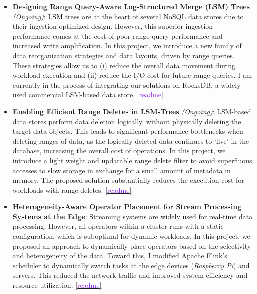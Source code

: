 \begin{itemize}\setlength\itemsep{0.3em}
  \item \textbf{Designing Range Query-Aware Log-Structured Merge (LSM) Trees} \textit{(Ongoing)}: LSM trees are at 
  the heart of several NoSQL data stores due to their ingestion-optimized design. However, this superior ingestion 
  performance comes at the cost of poor range query performance and increased write amplification. In this project, we 
  introduce a new family of data reorganization strategies and data layouts, driven by range queries. These strategies allow us to (i) 
  reduce the overall data movement during workload execution and (ii) reduce the I/O cost for future range queries. I am
  currently in the process of integrating our solutions on RocksDB, a widely used commercial LSM-based data store.
  \href{https://shubhamkaushik.com/projects/designing_range_query_aware_log_structured_merge_tree/}{[\textcolor{blueviolet}{readme}]}


  \item \textbf{Enabling Efficient Range Deletes in LSM-Trees} \textit{(Ongoing)}: LSM-based data stores perform 
  data deletion logically, without physically deleting the target data objects. This leads to significant performance 
  bottlenecks when deleting ranges of data, as the logically deleted data continues to `live' in the database, 
  increasing the overall cost of operations. In this project, we introduce a light weight and updatable range delete filter to avoid 
  superfluous accesses to slow storage in exchange for a small amount of metadata in memory. The proposed solution 
  substantially reduces the execution cost for workloads with range deletes.
  \href{https://shubhamkaushik.com/projects/enabling_efficient_range_deletes_in_lsm_trees/}{[\textcolor{blueviolet}{readme}]}


  \item \textbf{Heterogeneity-Aware Operator Placement for Stream Processing Systems at the Edge}: Streaming systems are 
  widely used for real-time data processing. However, all operators within a cluster runs with a static configuration, which 
  is suboptimal for dynamic workloads. In this project, we proposed an approach to dynamically place operators based on 
  the selectivity and heterogeneity of the data. Toward this, I modified Apache Flink's scheduler to dynamically 
  switch tasks at the edge devices (\textit{Raspberry Pi}) and servers. This reduced the network traffic and improved 
  system efficiency and resource utilization.
  \href{https://shubhamkaushik.com/projects/finding_vulnuerbilities_in_VS_Code_extensions/}{[\textcolor{blueviolet}{readme}]}



\end{itemize}
